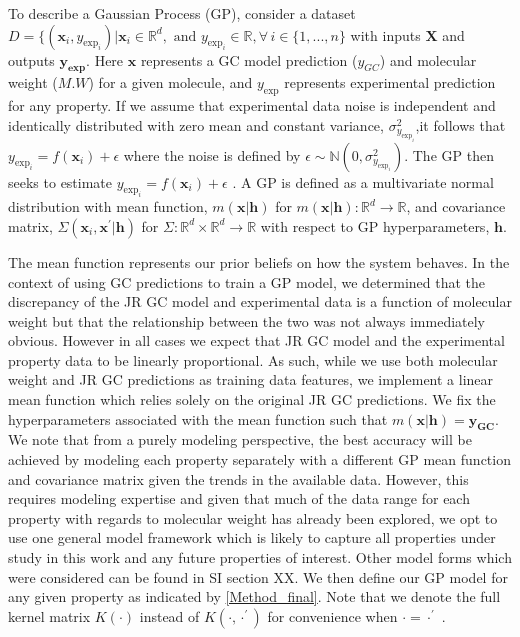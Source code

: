 \documentclass[journal=jacsat,manuscript=article]{achemso}
\begin{document}
To describe a Gaussian Process (GP), consider a dataset $D = \{(\mathbf{x}_i, y_{\text{exp}_i}) \vert \mathbf{x}_i \in \mathbb{R}^d, \text{ and } y_{\text{exp}_i} \in \mathbb{R}, \forall \, i \in \{1,. . ., n\}$ with inputs $\mathbf{X}$ and outputs $\mathbf{y_{\text{exp}}}$. Here $\mathbf{x}$ represents a GC model prediction ($y_{GC}$) and molecular weight ($M.W$) for a given molecule, and $y_{\text{exp}}$ represents experimental prediction for any property. If we assume that experimental data noise is independent and identically distributed with zero mean and constant variance, $\sigma_{y_{\text{exp}_i}}^2$,it follows that $y_{\text{exp}_i} = f(\mathbf{x}_i) + \epsilon$ where the noise is defined by $\epsilon \sim \mathbb{N}(0,\sigma_{y_{\text{exp}_i}}^2)$. The GP then seeks to estimate $y_{\text{exp}_i} = f(\mathbf{x}_i) + \epsilon$ \cite{Frazier2018AOptimization}. A GP is defined as a multivariate normal distribution with mean function, $m(\mathbf{x}\vert \mathbf{h})$ for $m(\mathbf{x}\vert \mathbf{h}): \mathbb{R}^d \rightarrow \mathbb{R}$, and covariance matrix, $\Sigma(\mathbf{x}_i, \mathbf{x}^{\prime} \vert \mathbf{h})$ for $\Sigma: \mathbb{R}^d \times \mathbb{R}^d \rightarrow \mathbb{R}$ with respect to GP hyperparameters, $\mathbf{h}$.

The mean function represents our prior beliefs on how the system behaves. In the context of using GC predictions to train a GP model, we determined that the discrepancy of the JR GC model and experimental data is a function of molecular weight but that the relationship between the two was not always immediately obvious. However in all cases we expect that JR GC model and the experimental property data to be linearly proportional. As such, while we use both molecular weight and JR GC predictions as training data features, we implement a linear mean function which relies solely on the original JR GC predictions. We fix the hyperparameters associated with the mean function such that $m(\mathbf{x}\vert \mathbf{h}) = \mathbf{y_{GC}}$. We note that from a purely modeling perspective, the best accuracy will be achieved by modeling each property separately with a different GP mean function and covariance matrix given the trends in the available data. However, this requires modeling expertise and given that much of the data range for each property with regards to molecular weight has already been explored, we opt to use one general model framework which is likely to capture all properties under study in this work and any future properties of interest. Other model forms which were considered can be found in SI section XX. We then define our GP model for any given property as indicated by \eqref{Method_final}. Note that we denote the full kernel matrix $K(\cdot)$ instead of $K(\cdot, \cdot^{\prime})$ for convenience when $\cdot = \cdot^{\prime}$ .
\end{document}
